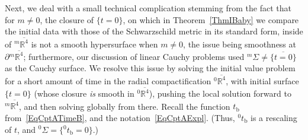 \documentclass[reqno,11pt,letterpaper]{amsart}
\numberwithin{equation}{section}
\numberwithin{figure}{section}
\theoremstyle{definition}
\theoremstyle{remark}
\newcommand{\R}{\mathbb{R}}
\newcommand{\ol}{\overline}
\newcommand{\pa}{\partial}
\newcommand{\bop}{{\mathrm{b}}}
\begin{document}
Next, we deal with a small technical complication stemming from the fact that for $m\neq 0$, the closure of $\{t=0\}$, on which in Theorem~\ref{ThmIBaby} we compare the initial data with those of the Schwarzschild metric in its standard form, inside of ${}^m\ol{\R^4}$ is not a smooth hypersurface when $m\neq 0$, the issue being smoothness at $\pa{}^m\ol{\R^4}$; furthermore, our discussion of linear Cauchy problems used ${}^m\Sigma\neq\overline{\{t=0\}}$ as the Cauchy surface. We resolve this issue by solving the initial value problem for a short amount of time in the radial compactification ${}^0\ol{\R^4}$, with initial surface $\{t=0\}$ (whose closure \emph{is} smooth in ${}^0\ol{\R^4}$), pushing the local solution forward to ${}^m\ol{\R^4}$, and then solving globally from there. Recall the function $t_\bop$ from~\eqref{EqCptATimeB}, and the notation~\eqref{EqCptAExpl}. (Thus, ${}^0 t_\bop$ is a rescaling of $t$, and ${}^0\Sigma=\{{}^0 t_\bop=0\}$.)
\end{document}
